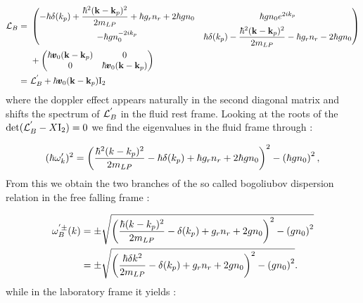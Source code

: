 \begin{equation}
    \begin{aligned}
    \mathcal{L}_B = \ &
    \begin{pmatrix}
        -\hbar\delta(k_p)+\dfrac{\hbar^2(\mathbf{k}-\mathbf{k}_p)^2}{2m_{LP}}+\hbar g_rn_r + 2\hbar g n_0 &  \hbar g n_0e^{2ik_p} \\
        -\hbar g n_0^{-2ik_p} & \hbar\delta(k_p)-\dfrac{\hbar^2(\mathbf{k}-\mathbf{k}_p)^2}{2m_{LP}}-\hbar g_rn_r - 2\hbar g n_0
    \end{pmatrix}\\
    &+\begin{pmatrix}
        \hbar \pmb{v}_0(\mathbf{k}-\mathbf{k}_p) & 0 \\
        0 & \hbar \pmb{v}_0(\mathbf{k}-\mathbf{k}_p)
    \end{pmatrix}\\
    = \ &\mathcal{L}_B^{'} + \hbar \pmb{v}_0(\mathbf{k}-\mathbf{k}_p)\mathrm{I_2}
    \end{aligned}
\end{equation}
where the doppler effect appears naturally in the second diagonal matrix and shifts the spectrum of $\mathcal{L}_B^{'}$ in the fluid rest frame. 
Looking at the roots of the $\mathrm{det}(\mathcal{L}_B^{'}-X\mathrm{I_2})=0$ we find the eigenvalues in the fluid frame through :

\begin{equation}
    (\hbar\omega'_k)^2 = \left(\dfrac{\hbar^2(k-k_p)^2}{2m_{LP}}-\hbar\delta(k_p)+\hbar g_rn_r +2\hbar g n_0\right)^2 - \left(\hbar g n_0\right)^2,
\end{equation}
From this we obtain the two branches of the so called bogoliubov dispersion relation in the free falling frame :

\begin{equation}
    \begin{aligned}
    \omega^{'\pm}_B(k)&=\pm\sqrt{\left(\dfrac{\hbar(k-k_p)^2}{2m_{LP}}-\delta(k_p)+ g_rn_r +2g n_0\right)^2 - \left(g n_0\right)^2} \\
    &=\pm\sqrt{\left(\dfrac{\hbar \delta k^2}{2m_{LP}}-\delta(k_p)+ g_rn_r +2g n_0\right)^2 - \left(g n_0\right)^2}.
    \end{aligned}
\end{equation}
while in the laboratory frame it yields :

